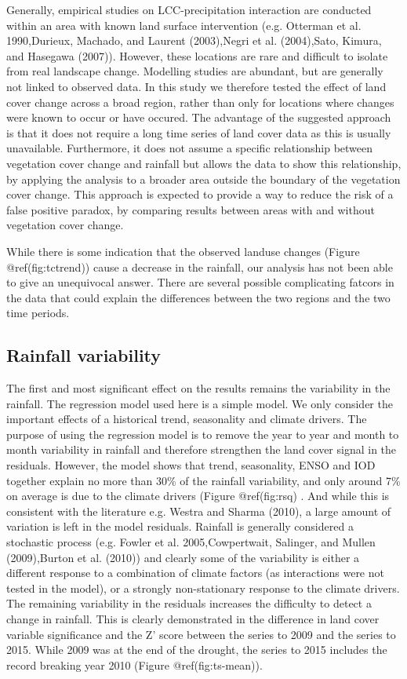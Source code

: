 \documentclass[fleqn,10pt,lineno]{wlpeerj} %
\begin{document}
Generally, empirical studies on LCC-precipitation interaction are
conducted within an area with known land surface intervention (e.g.
Otterman et al. 1990,Durieux, Machado, and Laurent (2003),Negri et al.
(2004),Sato, Kimura, and Hasegawa (2007)). However, these locations are
rare and difficult to isolate from real landscape change. Modelling
studies are abundant, but are generally not linked to observed data. In
this study we therefore tested the effect of land cover change across a
broad region, rather than only for locations where changes were known to
occur or have occured. The advantage of the suggested approach is that
it does not require a long time series of land cover data as this is
usually unavailable. Furthermore, it does not assume a specific
relationship between vegetation cover change and rainfall but allows the
data to show this relationship, by applying the analysis to a broader
area outside the boundary of the vegetation cover change. This approach
is expected to provide a way to reduce the risk of a false positive
paradox, by comparing results between areas with and without vegetation
cover change.

While there is some indication that the observed landuse changes (Figure
@ref(fig:tctrend)) cause a decrease in the rainfall, our analysis has
not been able to give an unequivocal answer. There are several possible
complicating fatcors in the data that could explain the differences
between the two regions and the two time periods.

\subsection{Rainfall variability}\label{rainfall-variability}

The first and most significant effect on the results remains the
variability in the rainfall. The regression model used here is a simple
model. We only consider the important effects of a historical trend,
seasonality and climate drivers. The purpose of using the regression
model is to remove the year to year and month to month variability in
rainfall and therefore strengthen the land cover signal in the
residuals. However, the model shows that trend, seasonality, ENSO and
IOD together explain no more than 30\% of the rainfall variability, and
only around 7\% on average is due to the climate drivers (Figure
@ref(fig:rsq) . And while this is consistent with the literature e.g.
Westra and Sharma (2010), a large amount of variation is left in the
model residuals. Rainfall is generally considered a stochastic process
(e.g. Fowler et al. 2005,Cowpertwait, Salinger, and Mullen (2009),Burton
et al. (2010)) and clearly some of the variability is either a different
response to a combination of climate factors (as interactions were not
tested in the model), or a strongly non-stationary response to the
climate drivers. The remaining variability in the residuals increases
the difficulty to detect a change in rainfall. This is clearly
demonstrated in the difference in land cover variable significance and
the Z' score between the series to 2009 and the series to 2015. While
2009 was at the end of the drought, the series to 2015 includes the
record breaking year 2010 (Figure @ref(fig:ts-mean)).
\end{document}
